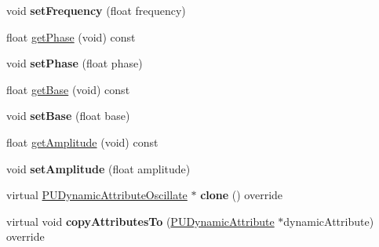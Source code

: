 \begin{DoxyCompactItemize}
\mbox{\label{classPUDynamicAttributeOscillate_a5c9f81187a931cc9c24c419842476e17}} 
void {\bfseries set\+Frequency} (float frequency)
\item 
float \hyperlink{classPUDynamicAttributeOscillate_a015486ebdae8dd9c71dd1bed413c5119}{get\+Phase} (void) const
\item 
\mbox{\label{classPUDynamicAttributeOscillate_a7f1d25dc486347b52ecbe370ca26204d}} 
void {\bfseries set\+Phase} (float phase)
\item 
float \hyperlink{classPUDynamicAttributeOscillate_adc434b9e002bf31436f522291de78b99}{get\+Base} (void) const
\item 
\mbox{\label{classPUDynamicAttributeOscillate_ac4e471bde537228a51ef8246f17afabf}} 
void {\bfseries set\+Base} (float base)
\item 
float \hyperlink{classPUDynamicAttributeOscillate_a83a4b87f76219e555f94d677fda4160a}{get\+Amplitude} (void) const
\item 
\mbox{\label{classPUDynamicAttributeOscillate_a427a747c743679fdcbce42aeb78c8b1e}} 
void {\bfseries set\+Amplitude} (float amplitude)
\item 
\mbox{\label{classPUDynamicAttributeOscillate_abff7299ab1fb870b6b1ed693476eaa69}} 
virtual \hyperlink{classPUDynamicAttributeOscillate}{P\+U\+Dynamic\+Attribute\+Oscillate} $\ast$ {\bfseries clone} () override
\item 
\mbox{\label{classPUDynamicAttributeOscillate_a1954b844f24fdbdd9a51004503aa0b27}} 
virtual void {\bfseries copy\+Attributes\+To} (\hyperlink{classPUDynamicAttribute}{P\+U\+Dynamic\+Attribute} $\ast$dynamic\+Attribute) override
\end{DoxyCompactItemize}
